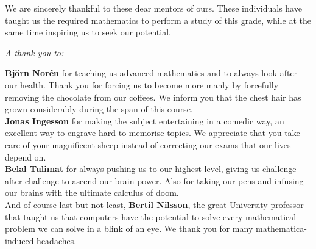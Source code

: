 \documentclass[main.tex]{subfiles}
\begin{document}
We are sincerely thankful to these dear mentors of ours. These individuals have
taught us the required mathematics to perform a study of this grade, while at
the same time inspiring us to seek our potential. \\

\begin{center}
  \emph{A thank you to:} \\
\end{center}

\textbf{Björn Norén} for teaching us advanced mathematics and to always
look after our health. Thank you for forcing us to become more manly by
forcefully removing the chocolate from our coffees. We inform you that the chest
hair has grown considerably during the span of this course.\\

\textbf{Jonas Ingesson} for making the subject entertaining in a
comedic way, an excellent way to engrave hard-to-memorise topics. We appreciate
that you take care of your magnificent sheep instead of correcting our exams
that our lives depend on.\\

\textbf{Belal Tulimat} for always pushing us to our highest level, giving us
challenge after challenge to ascend our brain power. Also for taking our pens
and infusing our brains with the ultimate calculus of doom. \\

And of course last but not least, \textbf{Bertil Nilsson}, the great University
professor that taught us that computers have the potential to
solve every mathematical problem we can solve in a blink of an eye. We thank you
for many mathematica-induced headaches.\\
\end{document}
